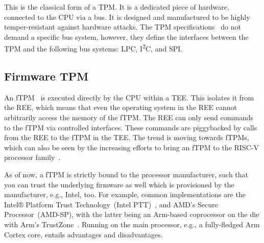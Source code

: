 This is the classical form of a TPM\@. It is a dedicated piece of hardware, connected to the CPU via a bus. It is designed and manufactured to be highly temper-resistant against hardware attacks.
The TPM specifications~\cite{tpm, tcgPcClient} do not demand a specific bus system, however, they define the interfaces between the TPM and the following bus systems: LPC, I\textsuperscript{2}C, and SPI\@.


\subsection{Firmware TPM}



An fTPM~\cite{Raj2015, 197213} is executed directly by the CPU within a \ac{TEE}.
This isolates it from the \ac{REE}, which means that even the operating system in the REE cannot arbitrarily access the memory of the fTPM\@.
The \ac{REE} can only send commands to the fTPM via controlled interfaces.
These commands are piggybacked by calls from the \ac{REE} to the fTPM in the \ac{TEE}.
The trend is moving towards fTPMs, which can also be seen by the increasing efforts to bring an fTPM to the RISC-V processor family~\cite{Boubakri2021}.

As of now, a fTPM is strictly bound to the processor manufacturer, such that you can trust the underlying firmware as well which is provisioned by the manufacturer, e.g., Intel, too. For example, common implementations are the Intel® Platform Trust Technology~(Intel PTT)~\cite{intelProcessorSecurity}, and AMD's Secure Processor~(AMD-SP), with the latter being an Arm-based coprocessor on the die with Arm's TrustZone~\cite{Khalid2020}.
Running on the main processor, e.g., a fully-fledged Arm Cortex core, entails advantages and disadvantages.



